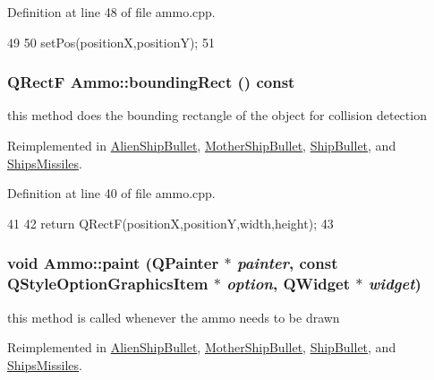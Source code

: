 Definition at line 48 of file ammo.cpp.


\begin{DoxyCode}
49 {
50     setPos(positionX,positionY);
51 }
\end{DoxyCode}
\hypertarget{class_ammo_a4c5548e35a4599210f0599328ef03f01}{
\subsubsection[{boundingRect}]{\setlength{\rightskip}{0pt plus 5cm}QRectF Ammo::boundingRect () const}}
\label{class_ammo_a4c5548e35a4599210f0599328ef03f01}
this method does the bounding rectangle of the object for collision detection 

Reimplemented in \hyperlink{class_alien_ship_bullet_a0a7aa5b5707281f2d204f903650df560}{AlienShipBullet}, \hyperlink{class_mother_ship_bullet_a994d08ae215b526f3bf8ccb63c6efabd}{MotherShipBullet}, \hyperlink{class_ship_bullet_ab2a2a467deb5546778e5f052705959dd}{ShipBullet}, and \hyperlink{class_ships_missiles_a0f26573f2bf4eed4c4320d09b1384c49}{ShipsMissiles}.

Definition at line 40 of file ammo.cpp.


\begin{DoxyCode}
41 {
42   return QRectF(positionX,positionY,width,height);
43 }
\end{DoxyCode}
\hypertarget{class_ammo_a3f4c8157fab369e46bac4bb88348d8c1}{
\subsubsection[{paint}]{\setlength{\rightskip}{0pt plus 5cm}void Ammo::paint (QPainter $\ast$ {\em painter}, \/  const QStyleOptionGraphicsItem $\ast$ {\em option}, \/  QWidget $\ast$ {\em widget})}}
\label{class_ammo_a3f4c8157fab369e46bac4bb88348d8c1}
this method is called whenever the ammo needs to be drawn 

Reimplemented in \hyperlink{class_alien_ship_bullet_a24f6404671b0e0ef258a8d7814ead18b}{AlienShipBullet}, \hyperlink{class_mother_ship_bullet_a931472c711d67537e8579ff36e6c5d0c}{MotherShipBullet}, \hyperlink{class_ship_bullet_a44c9cf7ab35d5fe69402226b341e2593}{ShipBullet}, and \hyperlink{class_ships_missiles_a709bf076bb74b37149907c06ffae942e}{ShipsMissiles}.

